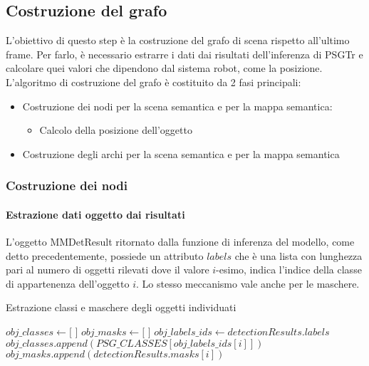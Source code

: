 \subsection{Costruzione del grafo}
L'obiettivo di questo step è la costruzione del grafo di scena rispetto all'ultimo frame. Per farlo, è necessario estrarre i dati dai risultati dell'inferenza di PSGTr e calcolare quei valori che dipendono dal sistema robot, come la posizione.
L'algoritmo di costruzione del grafo è costituito da 2 fasi principali:
\begin{itemize}
	\item Costruzione dei nodi per la scena semantica e per la mappa semantica:
	      \begin{itemize}
		      \item Calcolo della posizione dell'oggetto
	      \end{itemize}
	\item Costruzione degli archi per la scena semantica e per la mappa semantica
\end{itemize}

\subsubsection{Costruzione dei nodi}
\paragraph{Estrazione dati oggetto dai risultati}
L'oggetto MMDetResult ritornato dalla funzione di inferenza del modello, come detto precedentemente, possiede un attributo $labels$ che è una lista con lunghezza pari al numero di oggetti rilevati dove il valore $i$-esimo, indica l'indice della classe di appartenenza dell'oggetto $i$. Lo stesso meccanismo vale anche per le maschere.

\begin{algorithm}
	\caption{Estrazione classi e maschere degli oggetti individuati}
	\begin{algorithmic}[1]
		\State $obj\_classes \gets \text{[ ]}$
		\State $obj\_masks \gets \text{[ ]}$
		\State $obj\_labels\_ids \gets detectionResults.labels$
		\State $obj\_classes.append(PSG\_CLASSES[obj\_labels\_ids[i]])$
		\State $obj\_masks.append(detectionResults.masks[i])$
		\EndFor
	\end{algorithmic}
\end{algorithm}


